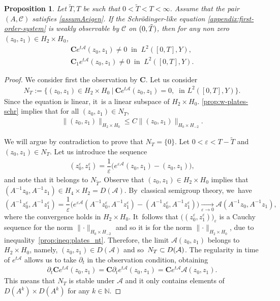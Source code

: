 \documentclass[10pt]{amsart}
\newtheorem{proposition}[theorem]{Proposition}
\theoremstyle{definition}
\let\mc\mathcal
\let\veps\varepsilon
\newcommand{\A}{\mc{A}}
\newcommand{\N}{\mathbb{N}}
\newcommand{\bC}{\boldsymbol{C}}
\providecommand{\norm}[1]{\lVert#1\rVert}
\begin{document}
\begin{proposition}\label{prop:nt-plates}
Let $\widetilde{T},T$ be such that $0 < \widetilde{T} < T < \infty$. Assume that the pair $(A, \mc{C})$ satisfies \cref{assumAeigen}. If the Schrödinger-like equation
\eqref{appendix:first-order-system} is weakly observable by $\mc{C}$ on $(0, \Tilde{T})$, then for any non zero $(z_0, z_1)\in H_2\times H_0$,
\begin{align*}
\bC e^{t\A}(z_0, z_1)\neq 0\ \text{ in }\ L^2([0, T], Y),\\
\bC_1 e^{t\A}(z_0, z_1)\neq 0\ \text{ in }\ L^2([0, T], Y).
\end{align*}
\end{proposition}
\begin{proof}
We consider first the observation by $\bC$. Let us consider
\begin{align*}
N_T:=\{(z_0, z_1)\in H_2\times H_0\ |\ \bC e^{t\A}(z_0, z_1)=0,\ \text{ in } L^2([0,T], Y)\}.
\end{align*}
Since the equation is linear, it~is a linear subspace of $H_2\times H_0$. \cref{prop:w-plates-schr} implies that for all $(z_0, z_1)\in N_T$,
\begin{align}\label{prop:ineq:plates_nt}
\norm{(z_0, z_1)}_{H_2\times H_0}\leq C\norm{(z_0, z_1)}_{H_0\times H_{-2}}.
\end{align}

We will argue by contradiction to prove that $N_T=\{0\}$. Let $0<\veps<T-\widetilde{T}$ and $(z_0, z_1)\in N_T$. Let us introduce the sequence
\begin{align*}
(z_0^\veps, z_1^\veps)=\dfrac{1}{\veps}\big(e^{\veps\A}(z_0, z_1)-(z_0, z_1)\big),
\end{align*}
and note that it belongs to $N_{\widetilde{T}}$. Observe that $(z_0, z_1)\in H_2\times H_0$ implies that $(A^{-1}z_0, A^{-1}z_1)\in H_4\times H_2=D(\A)$. By~classical semigroup theory, we~have
\[
(A^{-1}z_0^\veps, A^{-1}z_1^\veps)=\dfrac{1}{\veps}\big(e^{\veps\A}(A^{-1}z_0^\veps, A^{-1}z_1^\veps)-(A^{-1}z_0^\veps, A^{-1}z_1^\veps)\big)
\xrightarrow[\veps\to 0]{} \A (A^{-1}z_0, A^{-1}z_1),
\]
where the convergence holds in $H_2\times H_0$. It~follows that $\big((z_0^\veps, z_1^\veps)\big)_{\veps}$ is a Cauchy sequence for the norm $\norm{\cdot}_{H_0\times H_{-2}}$ and so it is for the norm $\norm{\cdot}_{H_2\times H_{0}}$, due to inequality~\eqref{prop:ineq:plates_nt}. Therefore, the limit $\A(z_0, z_1)$ belongs to $H_2\times H_0$, namely, $(z_0, z_1)\in D(\A)$ and so~$N_T\subset\nobreak D(\A)$. The regularity in time of $e^{t\A}$ allows us to take $\partial_t$ in the observation condition, obtaining
\begin{align*}
\partial_t\bC e^{t\A}(z_0, z_1)=\bC \partial_t e^{t\A}(z_0, z_1)=\bC e^{t\A}\A(z_0, z_1).
\end{align*}
This means that $N_T$ is stable under $\A$ and it only contains elements of $D(A^k)\times D(A^k)$ for any $k\in \N$.


\end{proof}
\end{document}

